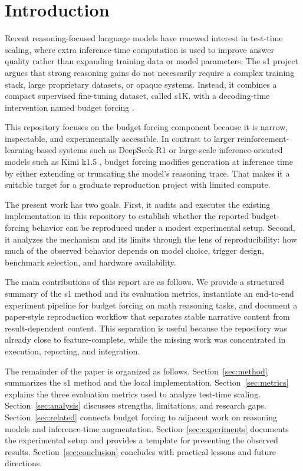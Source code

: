 \section{Introduction}

Recent reasoning-focused language models have renewed interest in test-time scaling, where extra inference-time computation is used to improve answer quality rather than expanding training data or model parameters. The s1 project argues that strong reasoning gains do not necessarily require a complex training stack, large proprietary datasets, or opaque systems. Instead, it combines a compact supervised fine-tuning dataset, called s1K, with a decoding-time intervention named budget forcing \citep{muennighoff2025s1}.

This repository focuses on the budget forcing component because it is narrow, inspectable, and experimentally accessible. In contrast to larger reinforcement-learning-based systems such as DeepSeek-R1 \citep{deepseek2025r1} or large-scale inference-oriented models such as Kimi k1.5 \citep{kimi2025k15}, budget forcing modifies generation at inference time by either extending or truncating the model's reasoning trace. That makes it a suitable target for a graduate reproduction project with limited compute.

The present work has two goals. First, it audits and executes the existing implementation in this repository to establish whether the reported budget-forcing behavior can be reproduced under a modest experimental setup. Second, it analyzes the mechanism and its limits through the lens of reproducibility: how much of the observed behavior depends on model choice, trigger design, benchmark selection, and hardware availability.

The main contributions of this report are as follows. We provide a structured summary of the s1 method and its evaluation metrics, instantiate an end-to-end experiment pipeline for budget forcing on math reasoning tasks, and document a paper-style reproduction workflow that separates stable narrative content from result-dependent content. This separation is useful because the repository was already close to feature-complete, while the missing work was concentrated in execution, reporting, and integration.

The remainder of the paper is organized as follows. Section~\ref{sec:method} summarizes the s1 method and the local implementation. Section~\ref{sec:metrics} explains the three evaluation metrics used to analyze test-time scaling. Section~\ref{sec:analysis} discusses strengths, limitations, and research gaps. Section~\ref{sec:related} connects budget forcing to adjacent work on reasoning models and inference-time augmentation. Section~\ref{sec:experiments} documents the experimental setup and provides a template for presenting the observed results. Section~\ref{sec:conclusion} concludes with practical lessons and future directions.


